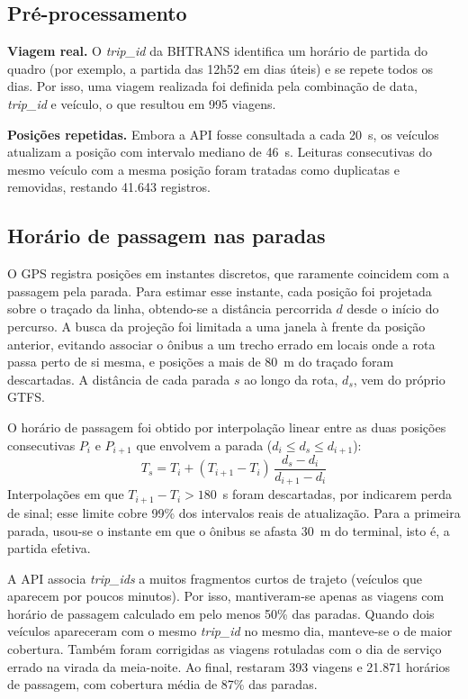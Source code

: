 \subsection{Pré-processamento}

\textbf{Viagem real.} O \textit{trip\_id} da BHTRANS identifica um horário de partida do
quadro (por exemplo, a partida das 12h52 em dias úteis) e se repete todos os dias. Por isso,
uma viagem realizada foi definida pela combinação de data, \textit{trip\_id} e veículo, o que
resultou em 995 viagens.

\textbf{Posições repetidas.} Embora a API fosse consultada a cada 20~s, os veículos atualizam
a posição com intervalo mediano de 46~s. Leituras consecutivas do mesmo veículo com a mesma
posição foram tratadas como duplicatas e removidas, restando 41.643 registros.

\subsection{Horário de passagem nas paradas}

O GPS registra posições em instantes discretos, que raramente coincidem com a passagem pela
parada. Para estimar esse instante, cada posição foi projetada sobre o traçado da linha,
obtendo-se a distância percorrida $d$ desde o início do percurso. A busca da projeção foi
limitada a uma janela à frente da posição anterior, evitando associar o ônibus a um trecho
errado em locais onde a rota passa perto de si mesma, e posições a mais de 80~m do traçado
foram descartadas. A distância de cada parada $s$ ao longo da rota, $d_s$, vem do próprio GTFS.

O horário de passagem foi obtido por interpolação linear entre as duas posições consecutivas
$P_i$ e $P_{i+1}$ que envolvem a parada ($d_i \le d_s \le d_{i+1}$):
\begin{equation}
T_s = T_i + (T_{i+1} - T_i)\,\frac{d_s - d_i}{d_{i+1} - d_i}
\end{equation}
Interpolações em que $T_{i+1} - T_i > 180$~s foram descartadas, por indicarem perda de sinal;
esse limite cobre 99\% dos intervalos reais de atualização. Para a primeira parada, usou-se o
instante em que o ônibus se afasta 30~m do terminal, isto é, a partida efetiva.

A API associa \textit{trip\_ids} a muitos fragmentos curtos de trajeto (veículos que aparecem
por poucos minutos). Por isso, mantiveram-se apenas as viagens com horário de passagem
calculado em pelo menos 50\% das paradas. Quando dois veículos apareceram com o mesmo
\textit{trip\_id} no mesmo dia, manteve-se o de maior cobertura. Também foram corrigidas as
viagens rotuladas com o dia de serviço errado na virada da meia-noite. Ao final, restaram 393
viagens e 21.871 horários de passagem, com cobertura média de 87\% das paradas.

